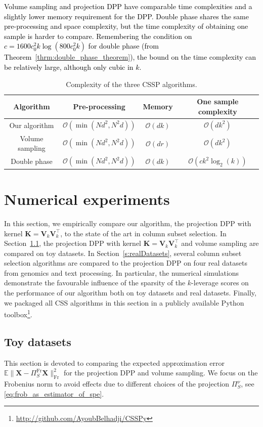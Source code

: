 \documentclass[twoside,11pt]{book}
\newcommand{\rev}[1]{\textcolor{black}{#1}}
\numberwithin{theorem}{chapter}
\numberwithin{definition}{chapter}
\numberwithin{proposition}{chapter}
\numberwithin{corollary}{chapter}
\numberwithin{example}{chapter}
\numberwithin{lemma}{chapter}
\numberwithin{assumption}{chapter}
\numberwithin{equation}{chapter}
\numberwithin{figure}{chapter}
\DeclareMathOperator{\Fr}{\mathrm{Fr}}
\DeclareMathOperator{\Tran}{\intercal}
\begin{document}
\rev{Volume sampling and projection DPP have comparable time complexities and a slightly lower memory requirement for the DPP. Double phase shares the same pre-processing and space complexity, but the time complexity of obtaining one sample is harder to compare. Remembering the condition on $c = 1600 c_{0}^{2}k \log(800 c_{0}^{2} k)$ for double phase (from Theorem~\ref{thrm:double_phase_theorem}), the bound on the time complexity can be relatively large, although only cubic in $k$.}
\begin{table}
\centering
 \begin{tabular}{| c| c| c| c|}
 \hline
  Algorithm & Pre-processing & Memory & One sample complexity\\
 \hline
 Our algorithm & $\mathcal{O}(\min(N d^{2},N^{2}d))$ & $\mathcal{O}(dk)$ & $\mathcal{O}(dk^{2})$\\
 \hline
 Volume sampling & $\mathcal{O}(\min(N d^{2},N^{2}d))$ & $\mathcal{O}(dr)$ & $\mathcal{O}(dk^{2})$ \\
 \hline
 Double phase  & $\mathcal{O}(\min(N d^{2},N^{2}d))$ & $\mathcal{O}(dk)$ & $\mathcal{O}(c k^{2} \log_{2}(k))$\\
 \hline
\end{tabular}
\caption{Complexity of the three CSSP algorithms.\label{table:CSSP_complexity}}
\end{table}


\section{Numerical experiments}
\label{s:numexpesection}
In this section, we empirically compare our algorithm, the projection DPP with kernel $\bm{K}=\bm{V}_k\bm{V}_k^{\Tran}$, to the state of the art in column subset selection. In Section~\ref{s:toyDatasets}, the projection DPP with kernel $\bm{K}=\bm{V}_k\bm{V}_k^{\Tran}$ and volume sampling are compared on toy datasets. In Section~\ref{s:realDatasets}, several column subset selection algorithms are compared to the projection DPP on four real datasets from genomics and text processing. In particular, the numerical simulations demonstrate the favourable influence of the sparsity of the $k$-leverage scores on the performance of our algorithm both on toy datasets and real datasets. Finally, we packaged all CSS algorithms in this section in a publicly available Python toolbox\footnote{\url{http://github.com/AyoubBelhadji/CSSPy}}.

\subsection{Toy datasets}
\label{s:toyDatasets}
This section is devoted to comparing the expected approximation error $\mathbb{E} \|\bm{X}- \Pi_{S}^{\Fr} \bm{X}\|_{\Fr}^{2}$ for the projection DPP and volume sampling. We focus on the Frobenius norm to avoid effects due to different choices of the projection $\Pi_{S}^{\nu}$, see \eqref{eq:frob_as_estimator_of_spe}.
\end{document}
